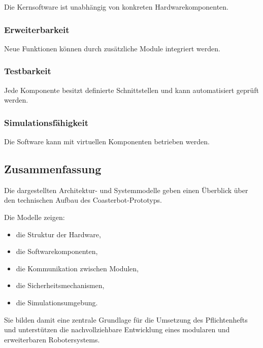 \documentclass[
  a4paper,
  12pt,
  DIV=12,        %
  parskip=half,  %
  headings=small %
]{scrartcl}
\theoremstyle{definition}
\providecommand{\tightlist}{%
  \setlength{\itemsep}{0pt}\setlength{\parskip}{0pt}}
\theoremstyle{definition}
\begin{document}
Die Kernsoftware ist unabhängig von konkreten Hardwarekomponenten.

\subsubsection{Erweiterbarkeit}\label{erweiterbarkeit-2}

Neue Funktionen können durch zusätzliche Module integriert werden.

\subsubsection{Testbarkeit}\label{testbarkeit-1}

Jede Komponente besitzt definierte Schnittstellen und kann automatisiert
geprüft werden.

\subsubsection{Simulationsfähigkeit}\label{simulationsfuxe4higkeit-1}

Die Software kann mit virtuellen Komponenten betrieben werden.

\subsection{Zusammenfassung}\label{zusammenfassung-9}

Die dargestellten Architektur- und Systemmodelle geben einen Überblick
über den technischen Aufbau des Coasterbot-Prototyps.

Die Modelle zeigen:

\begin{itemize}
\tightlist
\item
  die Struktur der Hardware,
\item
  die Softwarekomponenten,
\item
  die Kommunikation zwischen Modulen,
\item
  die Sicherheitsmechanismen,
\item
  die Simulationsumgebung.
\end{itemize}

Sie bilden damit eine zentrale Grundlage für die Umsetzung des
Pflichtenhefts und unterstützen die nachvollziehbare Entwicklung eines
modularen und erweiterbaren Robotersystems.
\end{document}
